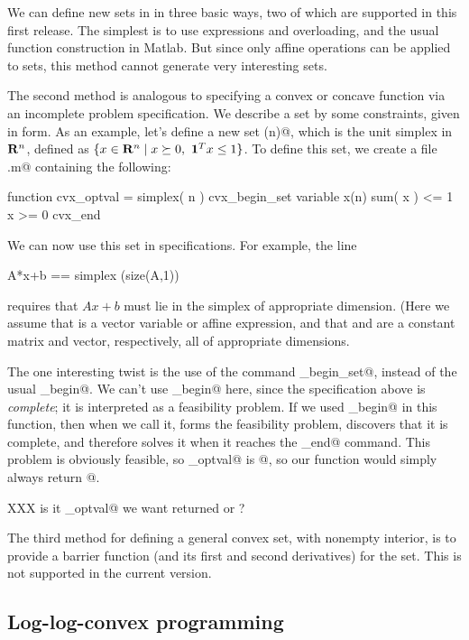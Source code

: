 \documentclass[12pt]{article}
\newcommand{\ones}{\mathbf 1}
\begin{document}
We can define new sets in \cvx in three basic ways, two of which
are supported in this first release.
The simplest is to use expressions and overloading, and the usual
function construction in Matlab.  But since only affine operations
can be applied to sets, this method cannot generate very 
interesting sets. 

The second method is analogous to specifying a convex or concave
function via an incomplete \cvx problem specification.
We describe a set by some constraints, given in \cvx form.
As an example, let's define a new set \verb@simplex(n)@, which is the
unit simplex in $\R^n$, defined as $\{x \in \R^n \;|\; 
x \succeq 0,~\ones^T x\leq 1 \}$.
To define this set, we create a file \verb@simplex.m@ containing
the following:
\begin{code}
function cvx_optval = simplex( n )
cvx_begin_set
variable x(n)
sum( x ) <= 1
x >= 0
cvx_end
\end{code}
We can now use this set in \cvx specifications.  For example, 
the line
\begin{code}
	A*x+b == simplex (size(A,1)) 
\end{code}
requires that $Ax+b$ must lie in the simplex of appropriate
dimension.
(Here we assume that \verb@x@ is a vector variable or affine
expression, and that \verb@A@ and \verb@b@ are a constant
matrix and vector, respectively, all of appropriate dimensions.

The one interesting twist is the use of the command 
\verb@cvx_begin_set@, instead of the usual \verb@cvx_begin@.
We can't use \verb@cvx_begin@ here, since the \cvx specification
above is \emph{complete}; it is interpreted as a feasibility problem.
If we used \verb@cvx_begin@ in this function, then when we call it,
\cvx forms the feasibility problem, discovers that it is complete,
and therefore solves it when it reaches the \verb@cvx_end@ command.
This problem is obviously feasible, so \verb@cvx_optval@ is @,
so our function would simply always return @.

XXX is it \verb@cvx_optval@ we want returned or \verb@x@?

The third method for defining a general convex set, with nonempty
interior, is to provide a barrier function (and its first and 
second derivatives) for the set.
This is not supported in the current version.
\fi

\iffalse
\subsection{Log-log-convex programming}
\end{document}
